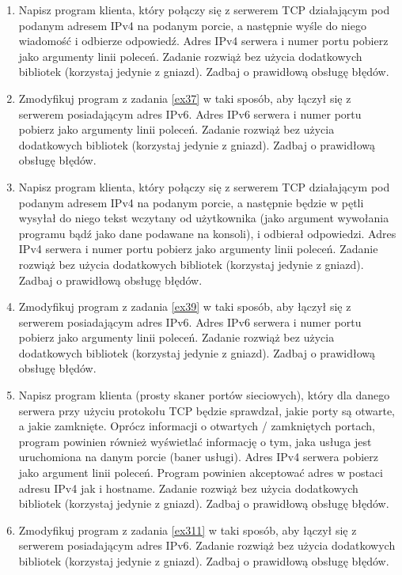 \documentclass{article}
\begin{document}
\begin{enumerate}[label=\textbf{3.\arabic*}]
     \item \label{ex37} Napisz program klienta, który połączy się z serwerem TCP działającym pod podanym adresem IPv4 na podanym porcie, a następnie wyśle do niego wiadomość i odbierze odpowiedź.  Adres IPv4 serwera i numer portu pobierz jako argumenty linii poleceń. Zadanie rozwiąż bez użycia dodatkowych bibliotek (korzystaj jedynie z gniazd). Zadbaj o prawidłową obsługę błędów. 
     
     \item Zmodyfikuj program z zadania \ref{ex37} w taki sposób,  aby łączył się z serwerem posiadającym adres IPv6.  Adres IPv6 serwera i numer portu pobierz jako argumenty linii poleceń. Zadanie rozwiąż bez użycia dodatkowych bibliotek (korzystaj jedynie z gniazd). Zadbaj o prawidłową obsługę błędów. 
     
     \item \label{ex39} Napisz program klienta, który połączy się z serwerem TCP działającym pod podanym adresem IPv4 na podanym porcie,  a następnie będzie w pętli wysyłał do niego tekst wczytany od użytkownika (jako argument wywołania programu bądź jako dane podawane na konsoli), i odbierał odpowiedzi.  Adres IPv4 serwera i numer portu pobierz jako argumenty linii poleceń. Zadanie rozwiąż bez użycia dodatkowych bibliotek (korzystaj jedynie z gniazd). Zadbaj o prawidłową obsługę błędów. 
     
     \item Zmodyfikuj program z zadania \ref{ex39} w taki sposób,  aby łączył się z serwerem posiadającym adres IPv6.  Adres IPv6 serwera i numer portu pobierz jako argumenty linii poleceń. Zadanie rozwiąż bez użycia dodatkowych bibliotek (korzystaj jedynie z gniazd). Zadbaj o prawidłową obsługę błędów. 

    \item  \label{ex311} Napisz program klienta (prosty skaner portów sieciowych), który dla danego serwera przy użyciu protokołu TCP będzie sprawdzał, jakie porty są otwarte, a jakie zamknięte. Oprócz informacji o otwartych / zamkniętych portach, program powinien również wyświetlać informację o tym, jaka usługa jest uruchomiona na danym porcie (baner usługi).  Adres IPv4 serwera pobierz jako argument linii poleceń. Program powinien akceptować adres w postaci adresu IPv4 jak i hostname.  Zadanie rozwiąż bez użycia dodatkowych bibliotek (korzystaj jedynie z gniazd). Zadbaj o prawidłową obsługę błędów.  
    
    \item Zmodyfikuj program z zadania \ref{ex311} w taki sposób,  aby łączył się z serwerem posiadającym adres IPv6. Zadanie rozwiąż bez użycia dodatkowych bibliotek (korzystaj jedynie z gniazd). Zadbaj o prawidłową obsługę błędów. 
    

\end{enumerate}
\end{document}
